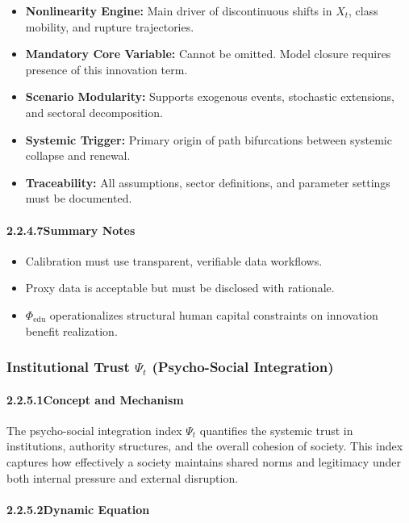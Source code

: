 \documentclass[12pt]{report}
\begin{document}
\begin{itemize}
  \item \textbf{Nonlinearity Engine:} Main driver of discontinuous shifts in $X_t$, class mobility, and rupture trajectories.
  \item \textbf{Mandatory Core Variable:} Cannot be omitted. Model closure requires presence of this innovation term.
  \item \textbf{Scenario Modularity:} Supports exogenous events, stochastic extensions, and sectoral decomposition.
  \item \textbf{Systemic Trigger:} Primary origin of path bifurcations between systemic collapse and renewal.
  \item \textbf{Traceability:} All assumptions, sector definitions, and parameter settings must be documented.
\end{itemize}

\paragraph{2.2.4.7\quad Summary Notes}

\begin{itemize}
  \item Calibration must use transparent, verifiable data workflows.
  \item Proxy data is acceptable but must be disclosed with rationale.
  \item $\Phi_{\text{edu}}$ operationalizes structural human capital constraints on innovation benefit realization.
\end{itemize}

\subsubsection{Institutional Trust $\Psi_t$ (Psycho-Social Integration)}

\paragraph{2.2.5.1\quad Concept and Mechanism}

The psycho-social integration index $\Psi_t$ quantifies the systemic trust in institutions, authority structures, and the overall cohesion of society. This index captures how effectively a society maintains shared norms and legitimacy under both internal pressure and external disruption.

\paragraph{2.2.5.2\quad Dynamic Equation}
\end{document}
